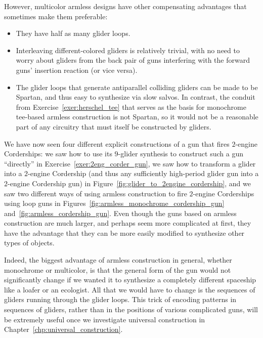 However, multicolor armless designs have other compensating advantages that sometimes make them preferable:\smallskip

\begin{itemize}
	\item They have half as many glider loops.\smallskip
	
	\item Interleaving different-colored gliders is relatively trivial, with no need to worry about gliders from the back pair of guns interfering with the forward guns' insertion reaction (or vice versa).\smallskip
	
	\item The glider loops that generate antiparallel colliding gliders can be made to be Spartan, and thus easy to synthesize via slow salvos. In contrast, the conduit from Exercise~\ref{exer:herschel_tee} that serves as the basis for monochrome tee-based armless construction is not Spartan, so it would not be a reasonable part of any circuitry that must itself be constructed by gliders.\smallskip 
\end{itemize}

We have now seen four different explicit constructions of a gun that fires $2$-engine Corderships: we saw how to use its $9$-glider synthesis to construct such a gun ``directly'' in Exercise~\ref{exer:2eng_corder_gun}, we saw how to transform a glider into a $2$-engine Cordership (and thus any sufficiently high-period glider gun into a $2$-engine Cordership gun) in Figure~\ref{fig:glider_to_2engine_cordership}, and we saw two different ways of using armless construction to fire $2$-engine Corderships using loop guns in Figures~\ref{fig:armless_monochrome_cordership_gun} and~\ref{fig:armless_cordership_gun}. Even though the guns based on armless construction are much larger, and perhaps seem more complicated at first, they have the advantage that they can be more easily modified to synthesize other types of objects.

Indeed, the biggest advantage of armless construction in general, whether monochrome or multicolor, is that the general form of the gun would not significantly change if we wanted it to synthesize a completely different spaceship like a loafer or an ecologist. All that we would have to change is the sequences of gliders running through the glider loops. This trick of encoding patterns in sequences of gliders, rather than in the positions of various complicated guns, will be extremely useful once we investigate universal construction in Chapter~\ref{chp:universal_construction}.


